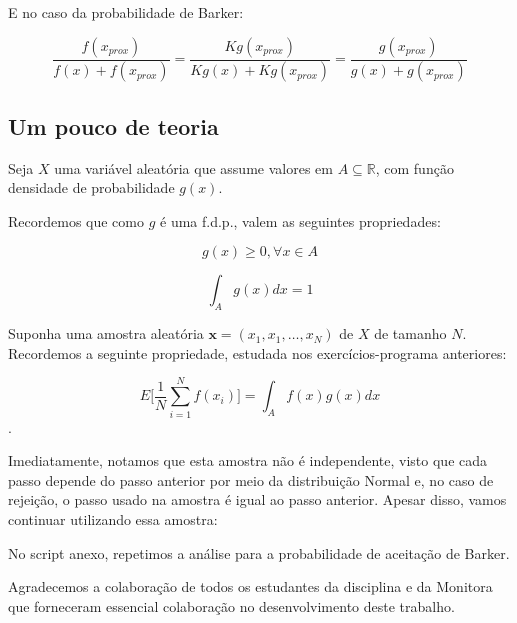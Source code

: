 \documentclass[]{article}
\begin{document}
E no caso da probabilidade de Barker:

\[\frac{f(x_{prox})}{f(x)+f(x_{prox})} = \frac{Kg(x_{prox})}{Kg(x)+Kg(x_{prox})}= \frac{g(x_{prox})}{g(x)+
g(x_{prox})}\]

\hypertarget{um-pouco-de-teoria}{%
\subsection{Um pouco de teoria}\label{um-pouco-de-teoria}}

Seja \(X\) uma variável aleatória que assume valores em
\(A \subseteq \mathbb{R}\), com função densidade de probabilidade
\(g(x)\).

Recordemos que como \(g\) é uma f.d.p., valem as seguintes propriedades:

\[g(x)\geq 0,\forall x \in A\]

\[\int_{A}g(x)dx=1\]

Suponha uma amostra aleatória \(\mathbf{x}=(x_1,x_1,\dots,x_N)\) de
\(X\) de tamanho \(N\). Recordemos a seguinte propriedade, estudada nos
exercícios-programa anteriores:

\[E\bigg[\frac{1}{N}\sum_{i=1}^{N} f(x_i)\bigg]= \int_A f(x)g(x)dx\].

Imediatamente, notamos que esta amostra não é independente, visto que
cada passo depende do passo anterior por meio da distribuição Normal e,
no caso de rejeição, o passo usado na amostra é igual ao passo anterior.
Apesar disso, vamos continuar utilizando essa amostra:


No script  anexo, repetimos a análise para a probabilidade de
aceitação de Barker.

Agradecemos a colaboração de todos os estudantes da disciplina e da
Monitora que forneceram essencial colaboração no desenvolvimento deste
trabalho.
\end{document}
